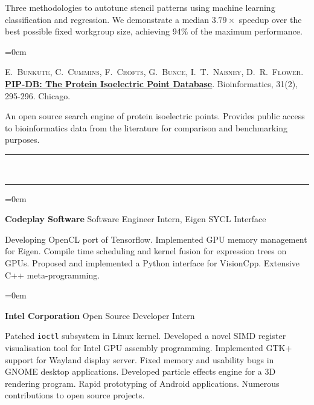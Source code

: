 \documentclass[a4paper,11pt,hidelinks]{scrartcl}
\newcommand{\MarginText}[1]{\marginpar{\raggedleft\itshape\normalsize#1}}
\newcommand{\Title}[1]{\noindent\rule{15cm}{0.4pt}\vspace{-.45em}\\
\noindent\spacedlowsmallcaps{\color{titlecolour}{#1}}

\vspace{-.85em}\noindent\rule{15cm}{0.4pt}\vspace{.2em}}
\newcommand{\Description}[1]{\hangindent=0em\hangafter=0%
\noindent\normalsize{#1}\vspace{1em}}
\newcommand{\ShortJob}[3]{\Description{\MarginText{#1}\textbf{#2},
  \textit{#3}}}
\newcommand{\Job}[4]{\Description{\MarginText{#1}\textbf{#2},
  \textit{#3}\newline\vspace{-.8em}

  \noindent
  #4}}
\begin{document}
\begin{cv}
{  \noindent %
  Three methodologies to autotune stencil patterns using machine learning classification and regression. We demonstrate a median $3.79\times$ speedup over the best possible fixed workgroup size, achieving 94\% of the maximum performance.%
}

\Description{%
  \MarginText{2015}%
  E.\ \textsc{Bunkute}, %
  C.\ \textsc{Cummins}, %
  F.\ \textsc{Crofts}, %
  G.\ \textsc{Bunce}, %
  I.\ T.\ \textsc{Nabney}, %
  D.\ R.\ \textsc{Flower}.
  \textbf{\href{http://bioinformatics.oxfordjournals.org/content/31/2/295.full?etoc}{PIP-DB:
      The Protein Isoelectric Point Database}}.
  Bioinformatics, 31(2), 295-296. Chicago. %
  \newline\vspace{-.8em}

  \noindent %
  An open source search engine of protein isoelectric points. Provides public access to bioinformatics data from the literature for comparison and benchmarking purposes.%
}


\newpage

\Title{Professional Experience}

\Description{\MarginText{2016}\textbf{Codeplay Software}
  \newline Software Engineer Intern, Eigen SYCL Interface
  \newline\vspace{-.8em}

  \noindent %
  Developing OpenCL port of Tensorflow. Implemented GPU memory management for Eigen. Compile time scheduling and kernel fusion for expression trees on GPUs. Proposed and implemented a Python interface for VisionCpp. Extensive C++ meta-programming.%
}

\Description{\MarginText{2012--2013}\textbf{Intel Corporation}
  \newline Open Source Developer Intern
  \newline\vspace{-.8em}

  \noindent %
  Patched \texttt{ioctl} subsystem in Linux kernel. Developed a novel SIMD register visualisation tool for Intel GPU assembly programming. Implemented GTK+ support for Wayland display server. Fixed memory and usability bugs in GNOME desktop applications. Developed particle effects engine for a 3D rendering program. Rapid prototyping of Android applications. Numerous contributions to open source projects.%
}


\end{cv}
\end{document}
